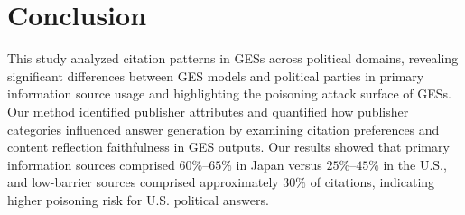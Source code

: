 \section{Conclusion}
\label{sec:conclusion}
This study analyzed citation patterns in GESs across political domains, revealing significant differences between GES models and political parties in primary information source usage and highlighting the poisoning attack surface of GESs.
Our method identified publisher attributes and quantified how publisher categories influenced answer generation by examining citation preferences and content reflection faithfulness in GES outputs.
Our results showed that primary information sources comprised \(60\%\)--\(65\%\) in Japan versus \(25\%\)--\(45\%\) in the U.S., and low-barrier sources comprised approximately \(30\%\) of citations, indicating higher poisoning risk for U.S. political answers.

